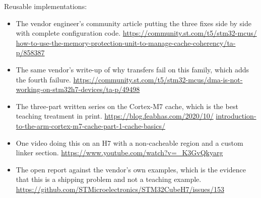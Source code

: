 Reusable implementations:
\begin{itemize}
\item The vendor engineer's community article putting the three fixes side by
side with complete configuration code.\newline
\url{https://community.st.com/t5/stm32-mcus/}\newline
\url{how-to-use-the-memory-protection-unit-to-manage-cache-coherency/ta-p/858387}
\item The same vendor's write-up of why transfers fail on this family, which
adds the fourth failure.\newline
\url{https://community.st.com/t5/stm32-mcus/dma-is-not-working-on-stm32h7-devices/ta-p/49498}
\item The three-part written series on the Cortex-M7 cache, which is the best
teaching treatment in print.\newline
\url{https://blog.feabhas.com/2020/10/}\newline
\url{introduction-to-the-arm-cortex-m7-cache-part-1-cache-basics/}
\item One video doing this on an H7 with a non-cacheable region and a custom
linker section.\newline
\url{https://www.youtube.com/watch?v=_K3GvQkyarg}
\item The open report against the vendor's own examples, which is the evidence
that this is a shipping problem and not a teaching example.\newline
\url{https://github.com/STMicroelectronics/STM32CubeH7/issues/153}
\end{itemize}
